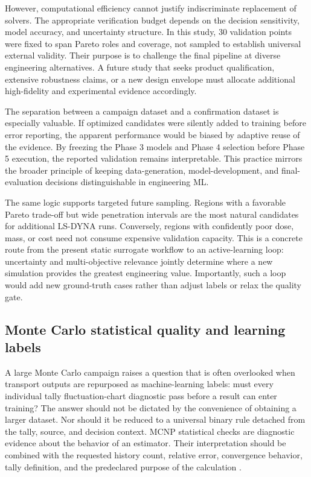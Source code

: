 \documentclass[12pt]{elsarticle}
\begin{document}
	However, computational efficiency cannot justify indiscriminate replacement of solvers. The appropriate verification budget depends on the decision sensitivity, model accuracy, and uncertainty structure. In this study, 30 validation points were fixed to span Pareto roles and coverage, not sampled to establish universal external validity. Their purpose is to challenge the final pipeline at diverse engineering alternatives. A future study that seeks product qualification, extensive robustness claims, or a new design envelope must allocate additional high-fidelity and experimental evidence accordingly.
	
	The separation between a campaign dataset and a confirmation dataset is especially valuable. If optimized candidates were silently added to training before error reporting, the apparent performance would be biased by adaptive reuse of the evidence. By freezing the Phase 3 models and Phase 4 selection before Phase 5 execution, the reported validation remains interpretable. This practice mirrors the broader principle of keeping data-generation, model-development, and final-evaluation decisions distinguishable in engineering ML.
	
	The same logic supports targeted future sampling. Regions with a favorable Pareto trade-off but wide penetration intervals are the most natural candidates for additional LS-DYNA runs. Conversely, regions with confidently poor dose, mass, or cost need not consume expensive validation capacity. This is a concrete route from the present static surrogate workflow to an active-learning loop: uncertainty and multi-objective relevance jointly determine where a new simulation provides the greatest engineering value. Importantly, such a loop would add new ground-truth cases rather than adjust labels or relax the quality gate.

	\subsection{Monte Carlo statistical quality and learning labels}

	A large Monte Carlo campaign raises a question that is often overlooked when transport outputs are repurposed as machine-learning labels: must every individual tally fluctuation-chart diagnostic pass before a result can enter training? The answer should not be dictated by the convenience of obtaining a larger dataset. Nor should it be reduced to a universal binary rule detached from the tally, source, and decision context. MCNP statistical checks are diagnostic evidence about the behavior of an estimator. Their interpretation should be combined with the requested history count, relative error, convergence behavior, tally definition, and the predeclared purpose of the calculation \cite{Kulesza2022MCNP63,ShultisFaw2011,Turner2007}.
\end{document}

